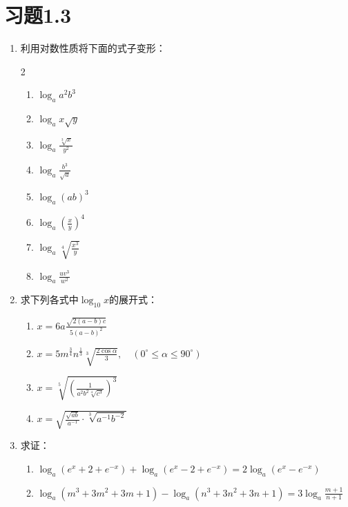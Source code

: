 \section*{习题1.3}
\begin{enumerate}
    \item 利用对数性质将下面的式子变形：
    \begin{multicols}{2}
\begin{enumerate}
    \item $\log_a a^2b^3$
    \item $\log_a x\sqrt{y}$
    \item $\log_a\frac{\sqrt[3]{x}}{y^2}$
    \item $\log_a\frac{b^3}{\sqrt{a}}$
    \item $\log_a(ab)^3$
    \item $\log_a\left(\frac{x}{y}\right)^4$
    \item $\log_a\sqrt[4]{\frac{x^3}{y}}$
    \item $\log_a\frac{uv^3}{w^2}$
\end{enumerate}        
    \end{multicols}

\item 求下列各式中$\log_{10}x$的展开式：
\begin{enumerate}
    \item $x=6a\frac{\sqrt{2(a-b)c}}{5(a-b)^2}$
    \item $x=5m^{\tfrac{3}{4}}n^{\tfrac{1}{3}}\sqrt[3]{\frac{2\cos\alpha}{3}},\quad (0^{\circ}\le \alpha\le 90^{\circ})$
    \item $x=\sqrt[5]{\left(\frac{1}{a^2b^2\sqrt[4]{c^3}}\right)^3}$
    \item $x=\sqrt{\frac{\sqrt{ab}}{a^{-1}}\cdot \sqrt[3]{a^{-1}b^{-2}}}$
\end{enumerate}
\item 求证：
\begin{enumerate}
    \item $\log_a (e^x+2+e^{-x})+\log_a(e^x-2+e^{-x})=2\log_a(e^x-e^{-x})$
    \item $\log_a(m^3+3m^2+3m+1)-\log_a(n^3+3n^2+3n+1)=3\log_a\frac{m+1}{n+1}$
\end{enumerate}


\end{enumerate}
